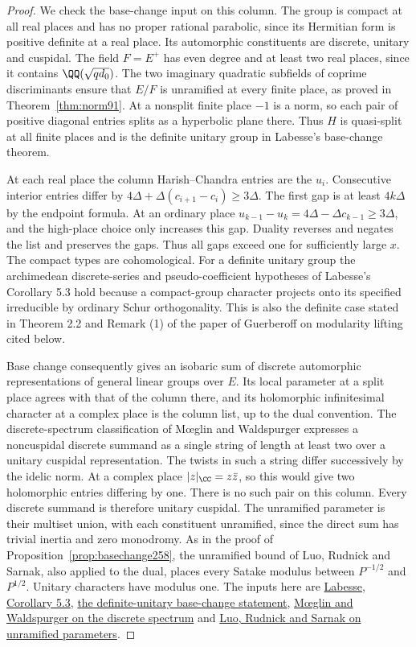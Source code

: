 \documentclass[a4paper,11pt]{article}
\theoremstyle{definition}
\theoremstyle{remark}
\numberwithin{equation}{section}
\begin{document}
\begin{proof}
We check the base-change input on this column. The group
is compact at all real places and has no proper rational
parabolic, since its Hermitian form is positive definite
at a real place. Its automorphic constituents are discrete,
unitary and cuspidal. The field \(F=E^+\) has even degree and at least two
real places, since it contains
\(\QQ(\sqrt{q d_0})\). The two imaginary quadratic
subfields of coprime discriminants ensure that \(E/F\) is
unramified at every finite place, as proved in
Theorem~\ref{thm:norm91}. At a nonsplit finite place \(-1\)
is a norm, so each pair of positive diagonal entries splits
as a hyperbolic plane there. Thus \(H\) is quasi-split at
all finite places and is the definite unitary group in
Labesse's base-change theorem.

At each real place the column Harish--Chandra entries are
the \(u_i\). Consecutive interior entries differ by
\(4\Delta+\Delta(c_{i+1}-c_i)\ge3\Delta\).
The first gap is at least \(4k\Delta\) by the endpoint
formula. At an ordinary place
\(u_{k-1}-u_k=4\Delta-\Delta c_{k-1}\ge3\Delta\),
and the high-place choice only increases this gap.
Duality reverses and negates the list and preserves the gaps.
Thus all gaps exceed one for sufficiently large \(x\).
The compact types are cohomological. For a definite unitary
group the archimedean discrete-series and pseudo-coefficient
hypotheses of Labesse's Corollary 5.3 hold because a compact-group
character projects onto its specified irreducible by ordinary
Schur orthogonality. This is also the definite case stated
in Theorem 2.2 and Remark (1) of the paper of
Guerberoff on modularity lifting cited below.

Base change consequently gives an isobaric sum of discrete
automorphic representations of general linear groups over
\(E\). Its local parameter at a split place agrees with that
of the column there, and its holomorphic infinitesimal
character at a complex place is the column list, up to the
dual convention. The discrete-spectrum classification of
M\oe glin and Waldspurger expresses a noncuspidal discrete
summand as a single string of length at least two over a
unitary cuspidal representation. The twists in such a string
differ successively by the idelic norm. At a complex place
\(|z|_{\CC}=z\bar z\), so this would give two holomorphic
entries differing by one. There is no such pair on this
column. Every discrete summand is therefore unitary cuspidal.
The unramified parameter is their multiset union, with each
constituent unramified, since the direct sum has trivial
inertia and zero monodromy. As in the proof of
Proposition~\ref{prop:basechange258}, the unramified bound
of Luo, Rudnick and Sarnak, also applied to the dual,
places every Satake modulus between \(P^{-1/2}\) and
\(P^{1/2}\). Unitary characters have modulus one.
The inputs here are
\href{https://webusers.imj-prg.fr/~michael.harris/CBCM.pdf}{Labesse, Corollary 5.3},
\href{https://doi.org/10.1112/S0010437X10005154}{the definite-unitary base-change statement},
\href{https://doi.org/10.24033/asens.1595}{M\oe glin and Waldspurger on the discrete spectrum}
and \href{https://doi.org/10.1090/pspum/066.2/1703764}{Luo, Rudnick and Sarnak on unramified parameters}.


\end{proof}
\end{document}
